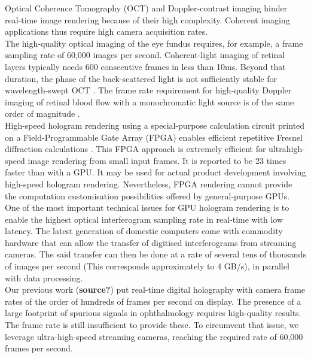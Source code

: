 Optical Coherence Tomography (OCT) and Doppler-contrast imaging hinder real-time image rendering because of their high complexity. Coherent imaging applications thus require high camera acquisition rates.\\

The high-quality optical imaging of the eye fundus requires, for example, a frame sampling rate of 60,000 images per second. Coherent-light imaging of retinal layers typically needs 600 consecutive frames in less than 10ms. Beyond that duration, the phase of the back-scattered light is not sufficiently stable for wavelength-swept OCT \cite{hillmann2012common, spahr2019phase}. The frame rate requirement for high-quality Doppler imaging of retinal blood flow with a monochromatic light source is of the same order of magnitude \cite{Puyo2020Spatio}.\\

High-speed hologram rendering using a special-purpose calculation circuit printed on a Field-Programmable Gate Array (FPGA) enables efficient repetitive Fresnel diffraction calculations \cite{yamamoto2020special, hara2022design}. This FPGA approach is extremely efficient for ultrahigh-speed image rendering from small input frames. It is reported to be 23 times faster than with a GPU. It may be used for actual product development involving high-speed hologram rendering. Nevertheless, FPGA rendering cannot provide the computation customisation possibilities offered by general-purpose GPUs.\\

One of the most important technical issues for GPU hologram rendering is to enable the highest optical interferogram sampling rate in real-time with low latency. The latest generation of domestic computers come with commodity hardware that can allow the transfer of digitised interferograms from streaming cameras. The said transfer can then be done at a rate of several tens of thousands of images per second (This corresponds approximately to 4 GB/s), in parallel with data processing.\\

Our previous work (\textbf{source?}) put real-time digital holography with camera frame rates of the order of hundreds of frames per second \cite{Puyo2020Realtime} on display. The presence of a large footprint of spurious signals in ophthalmology requires high-quality results. The frame rate is still insufficient to provide these. To circumvent that issue, we leverage ultra-high-speed streaming cameras, reaching the required rate of 60,000 frames per second.